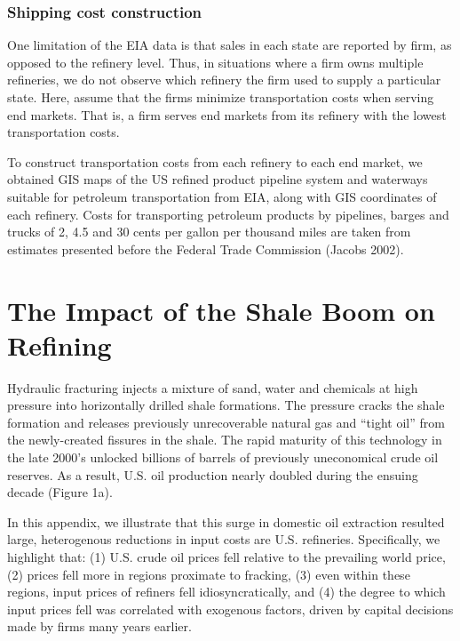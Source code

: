 \documentclass[12pt]{article}
\begin{document}
\subsubsection{Shipping cost construction \label{sec:shippingCosts}}
One limitation of the EIA data is that sales in each state are reported by firm, as opposed to the refinery level. Thus, in situations where a firm owns multiple refineries, we do not observe which refinery the firm used to supply a particular state.  Here, assume that the firms minimize transportation
costs when serving end markets.  That is, a firm serves end markets from its refinery with the lowest transportation costs.

To construct transportation costs from each refinery to each end market, we obtained GIS maps of the US refined product pipeline system
and waterways suitable for petroleum transportation from EIA, along with GIS coordinates
of each refinery. Costs for transporting petroleum products by pipelines, barges and trucks of 2, 4.5 and 30 cents per gallon per thousand miles are taken from estimates presented before the Federal Trade Commission (Jacobs 2002).

\section{The Impact of the Shale Boom on Refining \label{App:ShaleBoom}}

\setcounter{table}{0} \renewcommand{\thetable}{\Alph{section}.\arabic{table}}
\setcounter{figure}{0} \renewcommand{\thefigure}{\Alph{section}.\arabic{figure}}

Hydraulic fracturing injects a mixture of sand, water and chemicals at high pressure into horizontally drilled shale formations. The pressure cracks the shale formation and releases previously unrecoverable natural gas and ``tight oil'' from the newly-created fissures in the shale. The rapid maturity of this technology in the late 2000's unlocked billions of barrels of previously uneconomical crude oil reserves. As a result, U.S. oil production nearly doubled during the ensuing decade (Figure 1a).

In this appendix, we illustrate that this surge in domestic oil extraction resulted large, heterogenous reductions in input costs are U.S. refineries. Specifically, we highlight that: (1) U.S. crude oil prices fell relative to the prevailing world price, (2) prices fell more in regions proximate to fracking, (3) even within these regions, input prices of refiners fell idiosyncratically, and (4) the degree to which input prices fell was correlated with exogenous factors, driven by capital decisions made by firms many years earlier.
\end{document}
